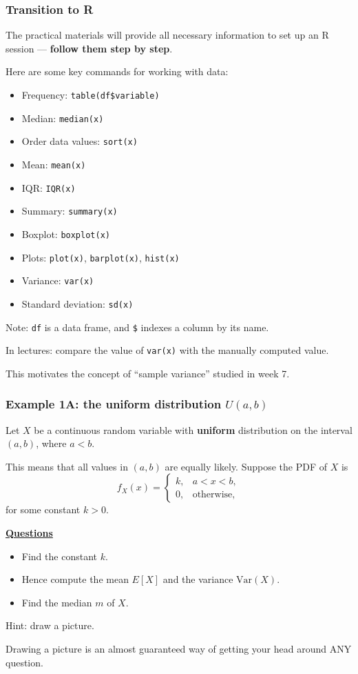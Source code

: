 \documentclass[t,8pt]{beamer}
\begin{document}
	\begin{frame}
		\frametitle{Transition to R}
		The practical materials will provide all necessary information to set up an R session — {\bf follow them step by step}. \par
		Here are some key commands for working with data:
		{\footnotesize
			\begin{itemize}
				\item Frequency: \texttt{table(df\$variable)}
				\item Median: \texttt{median(x)}
				\item Order data values: \texttt{sort(x)}
				\item Mean: \texttt{mean(x)}
				\item IQR: \texttt{IQR(x)}
				\item Summary: \texttt{summary(x)}
				\item Boxplot: \texttt{boxplot(x)}
				\item Plots: \texttt{plot(x)}, \texttt{barplot(x)}, \texttt{hist(x)}
				\item Variance: \texttt{var(x)}
				\item Standard deviation: \texttt{sd(x)}
			\end{itemize}
		}
		{\small
			Note: \texttt{df} is a data frame, and \texttt{\$} indexes a column by its name. \par
			In lectures: compare the value of \texttt{var(x)} with the manually computed value. \par
			\color{NavyBlue} This motivates the concept of ``sample variance'' studied in week 7.}
	\end{frame}
	
	\begin{frame}
		\frametitle{Example 1A: the uniform distribution $U(a,b)$}
		Let $X$ be a continuous random variable with {\bf uniform} distribution on the interval $(a,b)$, where $a<b$. \par
		This means that all values in $(a,b)$ are equally likely. Suppose the PDF of $X$ is
		\[
		f_X(x) =
		\begin{cases}
			k, & a < x < b,\\
			0, & \text{otherwise},
		\end{cases}
		\]
		for some constant $k>0$.
		
		{\bf\underline{Questions}}
		\begin{itemize}
			\item[(a)] Find the constant $k$. 
			\item[(b)] Hence compute the mean $E[X]$ and the variance $\mathrm{Var}(X)$. 
			\item[(c)] Find the median $m$ of $X$. 
		\end{itemize}
		Hint: draw a picture. \par
		{\small\color{NavyBlue} Drawing a picture is an almost guaranteed way of getting your head around ANY question.}
	\end{frame}
	
\end{document}
